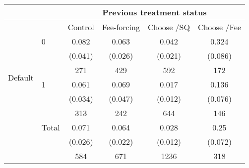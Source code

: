 \begin{tabular}{rl|cccc}
\toprule
      &       & \multicolumn{4}{c}{Previous treatment status} \\
\midrule
      &       & Control & Fee-forcing & Choose /SQ & Choose /Fee \\
\midrule
\midrule
\multicolumn{1}{c}{\multirow{6}[4]{*}{\begin{sideways}Default\end{sideways}}} & 0     & 0.082 & 0.063 & 0.042 & 0.324 \\
      &       & (0.041) & (0.026) & (0.021) & (0.086) \\
      &       & 271   & 429   & 592   & 172 \\
\cmidrule{2-6}      & 1     & 0.061 & 0.069 & 0.017 & 0.136 \\
      &       & (0.034) & (0.047) & (0.012) & (0.076) \\
      &       & 313   & 242   & 644   & 146 \\
\cmidrule{2-6}      & Total & 0.071 & 0.064 & 0.028 & 0.25 \\
      &       & (0.026) & (0.022) & (0.012) & (0.072) \\
      &       & 584   & 671   & 1236  & 318 \\
\bottomrule
\bottomrule
\end{tabular}%
